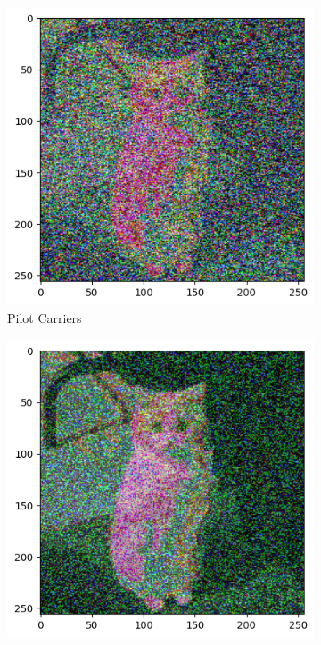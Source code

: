 \begin{figure}[htbp]
    \centering
     \begin{subfigure}[t]{.49\linewidth}
        \includegraphics[width=\linewidth]{../Source/results/output_0db.png}
        \caption{Pilot Carriers}
        \label{0db}
    \end{subfigure}
    \hfil
    \begin{subfigure}[t]{0.49\linewidth}
        \includegraphics[width=\linewidth]{../Source/results/output_10db.png}

\end{subfigure}
\end{figure}

